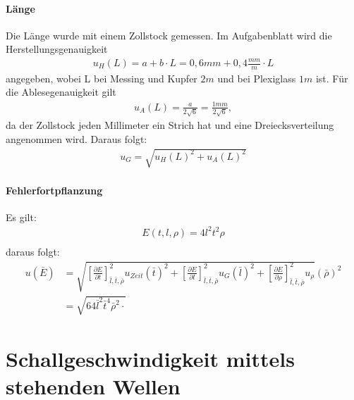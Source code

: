 \documentclass[11pt, a4paper]{article}
\begin{document}
    \paragraph{Länge}
    Die Länge wurde mit einem Zollstock gemessen. Im Aufgabenblatt wird die Herstellungsgenauigkeit
    \begin{align}
        u_H(L) = a+b \cdot L = 0,6mm + 0,4\frac{mm}{m} \cdot L
    \end{align}
    angegeben, wobei L bei Messing und Kupfer $2m$ und bei Plexiglass $1m$ ist.
    Für die Ablesegenauigkeit gilt
    \begin{align}
        u_A(L) = \frac{a}{2\sqrt{6}} = \frac{1mm}{2\sqrt{6}},
    \end{align}
    da der Zollstock jeden Millimeter ein Strich hat und eine Dreiecksverteilung angenommen wird.
    Daraus folgt:
    \begin{align}
        u_G = \sqrt{u_H(L)^2 + u_A(L)^2}
    \end{align}

    \paragraph{Fehlerfortpflanzung}
    Es gilt:
    \begin{align}
        E(t, l, \rho ) = 4l^2 t^2 \rho \\
    \end{align}
    daraus folgt:
    \begin{align}
        u(\bar{E}) &= \sqrt{\left[\frac{\partial E}{\partial t}\right]^2_{\bar{l}, \bar{t}, \bar{\rho}} u_{Zeit}(\bar{t})^2 +
        \left[\frac{\partial E}{\partial l}\right]^2_{\bar{l}, \bar{t}, \bar{\rho}} u_{G}(\bar{l})^2 +
        \left[\frac{\partial E}{\partial \rho}\right]^2_{\bar{l}, \bar{t}, \bar{\rho}} u_{\rho}}(\bar{\rho})^2 \\ \nonumber
        &= \sqrt{64 \bar{l}^2\bar{t}^4 \bar{\rho}^2 \cdot  }
    \end{align}


    \section{Schallgeschwindigkeit mittels stehenden Wellen}
\end{document}
